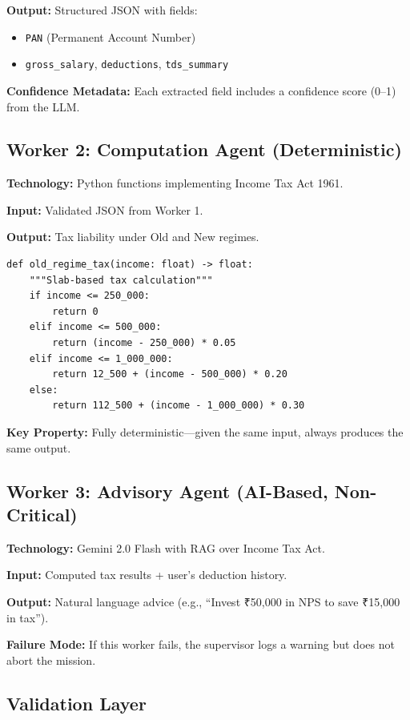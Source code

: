 \documentclass[conference]{IEEEtran}
\begin{document}
\textbf{Output:} Structured JSON with fields:
\begin{itemize}
    \item \texttt{PAN} (Permanent Account Number)
    \item \texttt{gross\_salary}, \texttt{deductions}, \texttt{tds\_summary}
\end{itemize}

\textbf{Confidence Metadata:} Each extracted field includes a confidence score (0--1) from the LLM.

\subsection{Worker 2: Computation Agent (Deterministic)}

\textbf{Technology:} Python functions implementing Income Tax Act 1961.

\textbf{Input:} Validated JSON from Worker 1.

\textbf{Output:} Tax liability under Old and New regimes.

\begin{lstlisting}
def old_regime_tax(income: float) -> float:
    """Slab-based tax calculation"""
    if income <= 250_000: 
        return 0
    elif income <= 500_000: 
        return (income - 250_000) * 0.05
    elif income <= 1_000_000: 
        return 12_500 + (income - 500_000) * 0.20
    else: 
        return 112_500 + (income - 1_000_000) * 0.30
\end{lstlisting}

\textbf{Key Property:} Fully deterministic---given the same input, always produces the same output.

\subsection{Worker 3: Advisory Agent (AI-Based, Non-Critical)}

\textbf{Technology:} Gemini 2.0 Flash with RAG over Income Tax Act.

\textbf{Input:} Computed tax results + user's deduction history.

\textbf{Output:} Natural language advice (e.g., ``Invest ₹50,000 in NPS to save ₹15,000 in tax'').

\textbf{Failure Mode:} If this worker fails, the supervisor logs a warning but does not abort the mission.

\subsection{Validation Layer}
\end{document}
